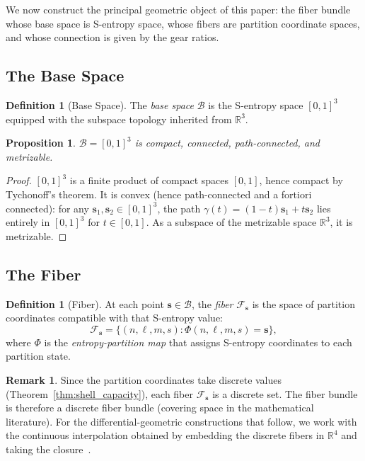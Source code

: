 \documentclass[11pt,twocolumn,a4paper]{article}
\newtheorem{proposition}[theorem]{Proposition}
\theoremstyle{definition}
\newtheorem{definition}[theorem]{Definition}
\newtheorem{remark}[theorem]{Remark}
\newcommand{\R}{\mathbb{R}}
\newcommand{\Fib}{\mathcal{F}}
\newcommand{\Bsp}{\mathcal{B}}
\begin{document}
We now construct the principal geometric object of this paper: the fiber bundle whose
base space is S-entropy space, whose fibers are partition coordinate spaces, and whose
connection is given by the gear ratios.

\subsection{The Base Space}\label{sec:fb:base}

\begin{definition}[Base Space]\label{def:basespace}
The \emph{base space} $\Bsp$ is the S-entropy space $[0,1]^3$ equipped with the subspace
topology inherited from $\R^3$.
\end{definition}

\begin{proposition}\label{prop:basespace_properties}
$\Bsp = [0,1]^3$ is compact, connected, path-connected, and metrizable.
\end{proposition}

\begin{proof}
$[0,1]^3$ is a finite product of compact spaces $[0,1]$, hence compact by Tychonoff's
theorem. It is convex (hence path-connected and a fortiori connected): for any
$\mathbf{s}_1, \mathbf{s}_2 \in [0,1]^3$, the path $\gamma(t) = (1-t)\mathbf{s}_1 +
t\mathbf{s}_2$ lies entirely in $[0,1]^3$ for $t \in [0,1]$. As a subspace of the
metrizable space $\R^3$, it is metrizable.
\end{proof}

\subsection{The Fiber}\label{sec:fb:fiber}

\begin{definition}[Fiber]\label{def:fiber}
At each point $\mathbf{s} \in \Bsp$, the \emph{fiber} $\Fib_{\mathbf{s}}$ is the space
of partition coordinates compatible with that S-entropy value:
\begin{equation}\label{eq:fiber}
  \Fib_{\mathbf{s}} = \{(n, \ell, m, s) : \Phi(n, \ell, m, s) = \mathbf{s}\},
\end{equation}
where $\Phi$ is the \emph{entropy-partition map} that assigns S-entropy coordinates to
each partition state.
\end{definition}

\begin{remark}\label{rem:fiber_discrete}
Since the partition coordinates take discrete values (Theorem~\ref{thm:shell_capacity}),
each fiber $\Fib_{\mathbf{s}}$ is a discrete set. The fiber bundle is therefore a
discrete fiber bundle (covering space in the mathematical literature). For the
differential-geometric constructions that follow, we work with the continuous
interpolation obtained by embedding the discrete fibers in $\R^4$ and taking the
closure~\cite{nakahara2003}.
\end{remark}
\end{document}
